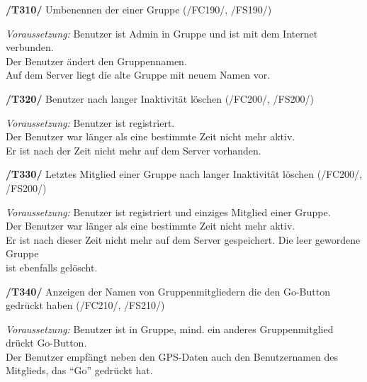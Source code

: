 \textbf{/T310/} Umbenennen der einer Gruppe (/FC190/, /FS190/)\\
\begin{center}
\vspace{-\parskip}
\begin{minipage}[t]{0.9\textwidth}
\emph{Voraussetzung:} Benutzer ist Admin in Gruppe und ist mit dem Internet verbunden.\\
Der Benutzer ändert den Gruppennamen.\\
Auf dem Server liegt die alte Gruppe mit neuem Namen vor.\\
\end{minipage}
\end{center}

\textbf{/T320/} Benutzer nach langer Inaktivität löschen (/FC200/, /FS200/)\\
\begin{center}
\vspace{-\parskip}
\begin{minipage}[t]{0.9\textwidth}
\emph{Voraussetzung:} Benutzer ist registriert.\\
Der Benutzer war länger als eine bestimmte Zeit nicht mehr aktiv.\\
Er ist nach der Zeit nicht mehr auf dem Server vorhanden.\\
\end{minipage}
\end{center}

\textbf{/T330/} Letztes Mitglied einer Gruppe nach langer Inaktivität löschen (/FC200/, /FS200/)\\
\begin{center}
\vspace{-\parskip}
\begin{minipage}[t]{0.9\textwidth}
\emph{Voraussetzung:} Benutzer ist registriert und einziges Mitglied einer Gruppe.\\
Der Benutzer war länger als eine bestimmte Zeit nicht mehr aktiv.\\
Er ist nach dieser Zeit nicht mehr auf dem Server gespeichert. Die leer gewordene Gruppe\\
ist ebenfalls gelöscht.\\
\end{minipage}
\end{center}

\textbf{/T340/} Anzeigen der Namen von Gruppenmitgliedern die den Go-Button gedrückt haben (/FC210/, /FS210/)\\
\begin{center}
\vspace{-\parskip}
\begin{minipage}[t]{0.9\textwidth}
\emph{Voraussetzung:} Benutzer ist in Gruppe, mind. ein anderes Gruppenmitglied drückt Go-Button.\\
Der Benutzer empfängt neben den GPS-Daten auch den Benutzernamen des Mitglieds, das "`Go"' gedrückt hat.\\
\end{minipage}
\end{center}

